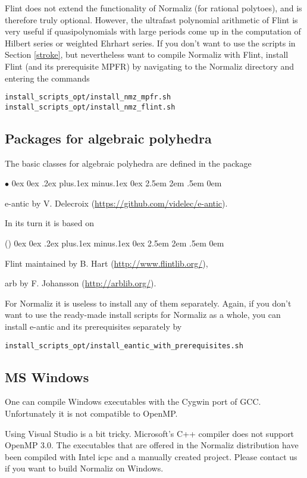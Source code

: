\documentclass[12pt,a4paper]{scrartcl}
\newcounter{listi}
\newcommand{\stdli}{ \topsep0ex \partopsep0ex %
\parsep.2ex plus.1ex minus.1ex \itemsep0ex%
\leftmargin2.5em \labelwidth2em \labelsep.5em \rightmargin0em}%
\newenvironment{arab}{\begin{list}{\textup{(\arabic{listi})}}%
	{\usecounter{listi}\stdli}}{\end{list}}
\renewenvironment{itemize}{\begin{list}{{$\bullet$}}{\stdli}}{\end{list}}
\theoremstyle{definition}
\begin{document}
Flint does not extend the functionality of Normaliz (for rational polytoes), and is therefore truly optional.
However, the ultrafast polynomial arithmetic of Flint is very useful if quasipolynomials with large periods come up in the computation of Hilbert series or weighted Ehrhart series. If you don't want to use the scripts in Section \ref{stroke}, but nevertheless want to compile Normaliz with Flint,  install Flint (and its prerequisite MPFR) by navigating to the Normaliz directory and entering the commands
\begin{Verbatim}
install_scripts_opt/install_nmz_mpfr.sh
install_scripts_opt/install_nmz_flint.sh
\end{Verbatim}

\subsection{Packages for algebraic polyhedra}

The basic classes for algebraic polyhedra are defined in the package
\begin{itemize}
	\item[]  e-antic by V. Delecroix (\url{https://github.com/videlec/e-antic}).
\end{itemize}
In its turn it is based on
\begin{arab}
	\item Flint maintained by B. Hart (\url{http://www.flintlib.org/}),
	\item arb by F. Johansson (\url{http://arblib.org/}).
\end{arab}

For Normaliz it is useless to install any of them separately. Again, if you don't want to use the ready-made install scripts for Normaliz as a whole, you can install e-antic and its prerequisites separately by
\begin{Verbatim}
install_scripts_opt/install_eantic_with_prerequisites.sh
\end{Verbatim}

\subsection{MS Windows}

One can compile Windows executables with the Cygwin port of GCC. Unfortunately it is not compatible to OpenMP.

Using Visual Studio is a bit tricky. Microsoft's C++ compiler does not support OpenMP 3.0.  The executables that are offered in the Normaliz distribution have been compiled with Intel icpc and a manually created project. Please contact us if you want to build Normaliz on Windows.
\end{document}

